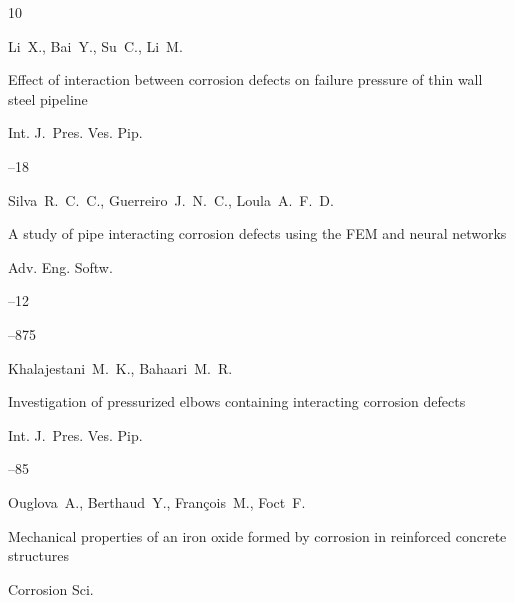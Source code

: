 \begin{thebibliography}{10}




\by Li~X., Bai~Y., Su~C., Li~M.

\paper Effect of interaction between corrosion defects on failure pressure of thin wall steel pipeline

\jour Int. J.~Pres. Ves. Pip.



--18






\by Silva~R.~C.~C., Guerreiro~J.~N.~C., Loula~A.~F.~D.

\paper A study of pipe interacting corrosion defects using the FEM and neural networks

\jour Adv. Eng. Softw.



--12

--875






\by Khalajestani~M.~K., Bahaari~M.~R.

\paper Investigation of pressurized elbows containing interacting corrosion defects

\jour Int. J.~Pres. Ves. Pip.



--85






\by Ouglova~A., Berthaud~Y., Fran\c{c}ois~M., Foct~F.

\paper Mechanical properties of an iron oxide formed by corrosion in reinforced concrete structures

\jour Corrosion Sci.


\end{thebibliography}

